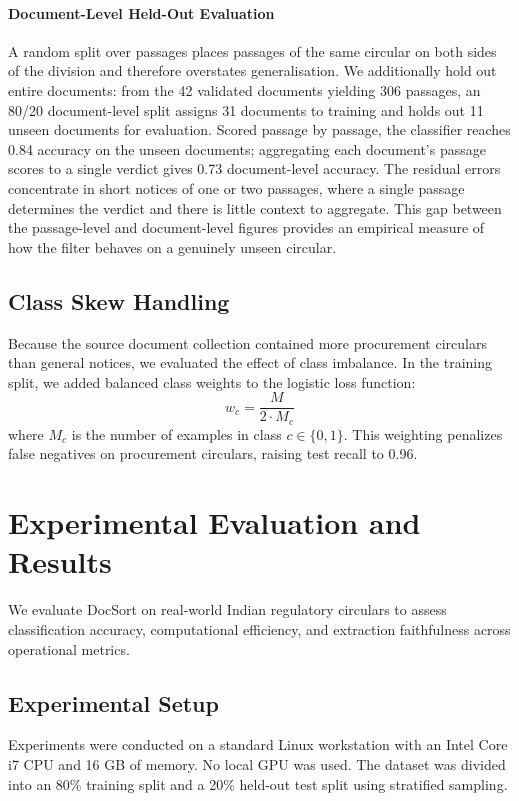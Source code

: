 \documentclass{article}
\begin{document}
\paragraph{Document-Level Held-Out Evaluation}
A random split over passages places passages of the same circular on both sides of the division and therefore overstates generalisation. We additionally hold out entire documents: from the 42 validated documents yielding 306 passages, an 80/20 document-level split assigns 31 documents to training and holds out 11 unseen documents for evaluation. Scored passage by passage, the classifier reaches 0.84 accuracy on the unseen documents; aggregating each document's passage scores to a single verdict gives 0.73 document-level accuracy. The residual errors concentrate in short notices of one or two passages, where a single passage determines the verdict and there is little context to aggregate. This gap between the passage-level and document-level figures provides an empirical measure of how the filter behaves on a genuinely unseen circular.

\subsection{Class Skew Handling}
Because the source document collection contained more procurement circulars than general notices, we evaluated the effect of class imbalance. In the training split, we added balanced class weights to the logistic loss function:
\begin{equation}
    w_c = \frac{M}{2 \cdot M_c}
\end{equation}
where $M_c$ is the number of examples in class $c \in \{0, 1\}$. This weighting penalizes false negatives on procurement circulars, raising test recall to 0.96.

\section{Experimental Evaluation and Results}

We evaluate DocSort on real-world Indian regulatory circulars to assess classification accuracy, computational efficiency, and extraction faithfulness across operational metrics.

\subsection{Experimental Setup}
Experiments were conducted on a standard Linux workstation with an Intel Core i7 CPU and 16 GB of memory. No local GPU was used. The dataset was divided into an 80\% training split and a 20\% held-out test split using stratified sampling.
\end{document}

